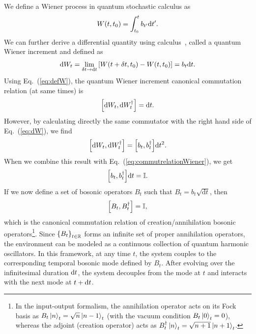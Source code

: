 We define a Wiener process in quantum stochastic calculus as
\begin{equation}\label{eq:defW}
    W(t,t_0) = \int_{t_0}^{t}b_{t'} \mathrm{d}t'.
\end{equation}
We can further derive a differential quantity using calculus~\cite{LectureNotes}, called a quantum Wiener increment and defined as
\begin{equation}\label{eq:dW}
    \mathrm{d}W_t = \lim_{\delta t\rightarrow \mathrm{d}t}\qty[W(t+\delta t,t_0)-W(t,t_0)]=b_t \mathrm{d}t.
\end{equation}
Using Eq.~(\ref{eq:defW}), the quantum Wiener increment canonical commutation relation (at same times) is
\begin{equation}\label{eq:commutrelationWiener}
    \qty[\mathrm{d}W_t,\mathrm{d}W_t^\dagger]=\mathrm{d}t.
\end{equation}
However, by calculating directly the same commutator with the right hand side of Eq.~(\ref{eq:dW}), we find
\begin{equation}
    \qty[\mathrm{d}W_t,\mathrm{d}W_t^\dagger]=\qty[b_t,b_t^\dagger]\mathrm{d}t^2.
\end{equation}
When we combine this result with Eq.~(\ref{eq:commutrelationWiener}), we get
\begin{equation}
    \qty[b_t,b_t^\dagger]\mathrm{d}t=\mathbb{I}.
\end{equation}
If we now define a set of bosonic operators $B_t$ such that $B_t=b_t\sqrt{\mathrm{d}t}$, then
\begin{equation}
    \qty[B_t,B_t^\dagger]=\mathbb{I},
\end{equation}
which is the canonical commutation relation of creation/annihilation bosonic operators\footnote{In the input-output formalism, the annihilation operator acts on its Fock basis as $B_t\ket{n}_t=\sqrt{n}\ket{n-1}_t$ (with the vacuum condition $B_t\ket{0}_t=0$), whereas the adjoint (creation operator) acts as $B_t^\dagger\ket{n}_t=\sqrt{n+1}\ket{n+1}_t$.}. Since $\qty{B_t}_{t\in\mathbb{R}}$ forms an infinite set of proper annihilation operators, the environment can be modeled as a continuous collection of quantum harmonic oscillators. In this framework, at any time $t$, the system couples to the corresponding temporal bosonic mode defined by $B_t$. After evolving over the infinitesimal duration $\mathrm{d}t$, the system decouples from the mode at $t$ and interacts with the next mode at $t+\mathrm{d}t$.

